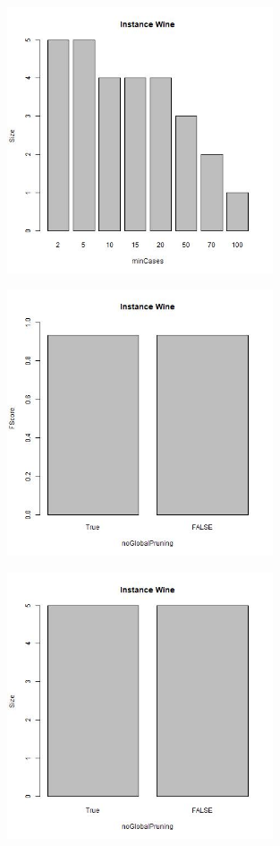 \documentclass[12pt,a4paper]{article}
\begin{document}
\begin{figure}[H]
\centering
\includegraphics[width=0.7\textwidth]{WineSizeMinCases.jpg}
\end{figure}

\begin{figure}[H]
\centering
\includegraphics[width=0.7\textwidth]{WineFScoreNoGlobalPruning.jpg}
\end{figure}

\begin{figure}[H]
\centering
\includegraphics[width=0.7\textwidth]{WineSizeNoGlobalPruning.jpg}
\end{figure}
\end{document}
